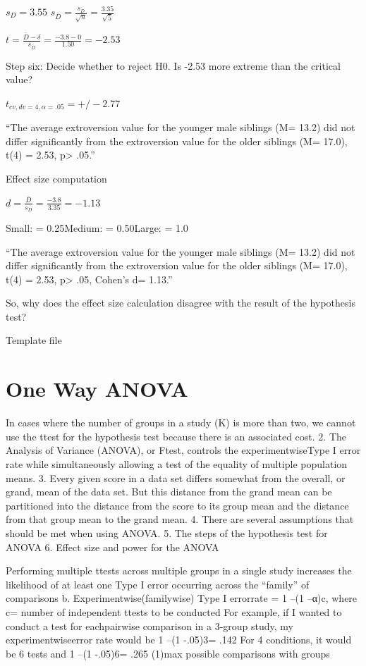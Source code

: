 \documentclass[]{book}
\theoremstyle{definition}
\theoremstyle{definition}
\theoremstyle{definition}
\theoremstyle{remark}
\begin{document}
{\(s_D=3.55\) \(s_\bar{D} =\frac{s_D}{\sqrt{n}}= \frac{3.35}{\sqrt{5}}\)

\(t = \frac{\bar{D}-\delta}{s_\bar{D}} = \frac{-3.8-0}{1.50}= -2.53\)

Step six: Decide whether to reject H0. Is -2.53 more extreme than the
critical value?

\(t_{cv,dv=4, \alpha=.05}= +/- 2.77\)

``The average extroversion value for the younger male siblings (M= 13.2)
did not differ significantly from the extroversion value for the older
siblings (M= 17.0), t(4) = 2.53, p\textgreater{} .05.''

Effect size computation

\(d = \frac{\bar{D}}{s_D}= \frac{-3.8}{3.35} = -1.13\)

Small: = 0.25Medium: = 0.50Large: = 1.0

``The average extroversion value for the younger male siblings (M= 13.2)
did not differ significantly from the extroversion value for the older
siblings (M= 17.0), t(4) = 2.53, p\textgreater{} .05, Cohen's d= 1.13.''

So, why does the effect size calculation disagree with the result of the
hypothesis test?

Template file

\chapter{One Way ANOVA}\label{one-way-anova}

In cases where the number of groups in a study (K) is more than two, we
cannot use the ttest for the hypothesis test because there is an
associated cost. 2. The Analysis of Variance (ANOVA), or Ftest, controls
the experimentwiseType I error rate while simultaneously allowing a test
of the equality of multiple population means. 3. Every given score in a
data set differs somewhat from the overall, or grand, mean of the data
set. But this distance from the grand mean can be partitioned into the
distance from the score to its group mean and the distance from that
group mean to the grand mean. 4. There are several assumptions that
should be met when using ANOVA. 5. The steps of the hypothesis test for
ANOVA 6. Effect size and power for the ANOVA

Performing multiple ttests across multiple groups in a single study
increases the likelihood of at least one Type I error occurring across
the ``family'' of comparisons b. Experimentwise(familywise) Type I
errorrate = 1 --(1 --α)c, where c= number of independent ttests to be
conducted For example, if I wanted to conduct a test for eachpairwise
comparison in a 3-group study, my experimentwiseerror rate would be 1
--(1 -.05)3= .142 For 4 conditions, it would be 6 tests and 1 --(1
-.05)6= .265 (1)max possible comparisons with groups

}
\end{document}
